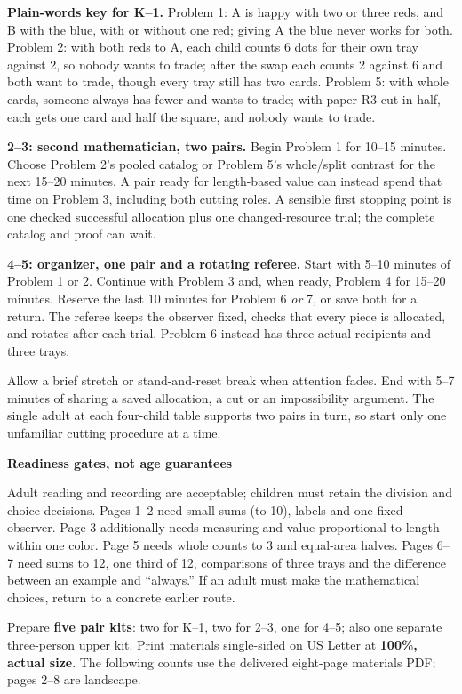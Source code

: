 \documentclass[11pt]{article}
\newcommand{\heading}[1]{\par\vspace{1.5mm}{\large\bfseries #1}\par\vspace{.8mm}}
\newcommand{\subhead}[1]{\par\vspace{1mm}\textbf{#1}\par}
\newcommand{\page}[1]{\newpage\heading{#1}}
\begin{document}
\textbf{Plain-words key for K--1.} Problem 1: A is happy with two or three reds, and B with the blue, with or without one red; giving A the blue never works for both. Problem 2: with both reds to A, each child counts 6 dots for their own tray against 2, so nobody wants to trade; after the swap each counts 2 against 6 and both want to trade, though every tray still has two cards. Problem 5: with whole cards, someone always has fewer and wants to trade; with paper R3 cut in half, each gets one card and half the square, and nobody wants to trade.

\textbf{2--3: second mathematician, two pairs.} Begin Problem 1 for 10--15 minutes. Choose Problem 2's pooled catalog or Problem 5's whole/split contrast for the next 15--20 minutes. A pair ready for length-based value can instead spend that time on Problem 3, including both cutting roles. A sensible first stopping point is one checked successful allocation plus one changed-resource trial; the complete catalog and proof can wait.

\textbf{4--5: organizer, one pair and a rotating referee.} Start with 5--10 minutes of Problem 1 or 2. Continue with Problem 3 and, when ready, Problem 4 for 15--20 minutes. Reserve the last 10 minutes for Problem 6 \emph{or} 7, or save both for a return. The referee keeps the observer fixed, checks that every piece is allocated, and rotates after each trial. Problem 6 instead has three actual recipients and three trays.

Allow a brief stretch or stand-and-reset break when attention fades. End with 5--7 minutes of sharing a saved allocation, a cut or an impossibility argument. The single adult at each four-child table supports two pairs in turn, so start only one unfamiliar cutting procedure at a time.

\subhead{Readiness gates, not age guarantees}
Adult reading and recording are acceptable; children must retain the division and choice decisions. Pages 1--2 need small sums (to 10), labels and one fixed observer. Page 3 additionally needs measuring and value proportional to length within one color. Page 5 needs whole counts to 3 and equal-area halves. Pages 6--7 need sums to 12, one third of 12, comparisons of three trays and the difference between an example and ``always.'' If an adult must make the mathematical choices, return to a concrete earlier route.

\page{Print and assemble the actual kit}
Prepare \textbf{five pair kits}: two for K--1, two for 2--3, one for 4--5; also one separate three-person upper kit. Print materials single-sided on US Letter at \textbf{100\%, actual size}. The following counts use the delivered eight-page materials PDF; pages 2--8 are landscape.
\end{document}
